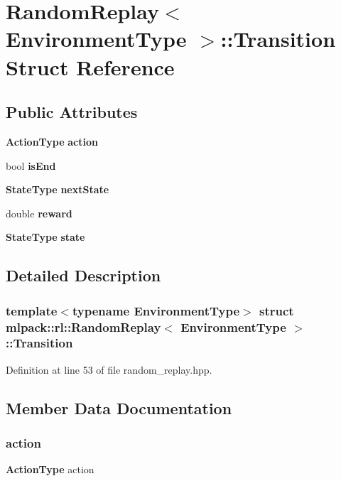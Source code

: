 \section{Random\+Replay$<$ Environment\+Type $>$\+:\+:Transition Struct Reference}
\label{structmlpack_1_1rl_1_1RandomReplay_1_1Transition}
\subsection*{Public Attributes}
\begin{DoxyCompactItemize}
\item 
\textbf{ Action\+Type} \textbf{ action}
\item 
bool \textbf{ is\+End}
\item 
\textbf{ State\+Type} \textbf{ next\+State}
\item 
double \textbf{ reward}
\item 
\textbf{ State\+Type} \textbf{ state}
\end{DoxyCompactItemize}


\subsection{Detailed Description}
\subsubsection*{template$<$typename Environment\+Type$>$\newline
struct mlpack\+::rl\+::\+Random\+Replay$<$ Environment\+Type $>$\+::\+Transition}



Definition at line 53 of file random\+\_\+replay.\+hpp.



\subsection{Member Data Documentation}
\mbox{\label{structmlpack_1_1rl_1_1RandomReplay_1_1Transition_a99189868c044162e6d669fd832ecdc81}} 
\subsubsection{action}
{\footnotesize\ttfamily \textbf{ Action\+Type} action}




